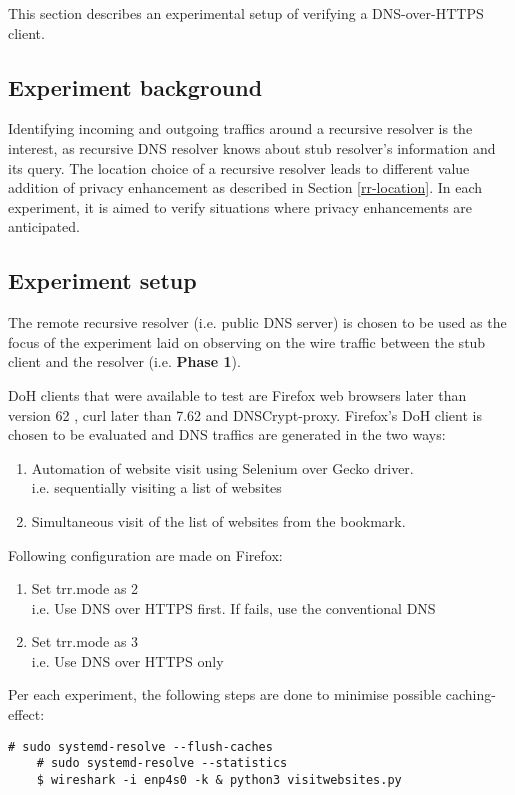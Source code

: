 This section describes an experimental setup of verifying a DNS-over-HTTPS client.

\subsection{Experiment background}
Identifying incoming and outgoing traffics around a recursive resolver is the interest, as recursive DNS resolver knows about stub resolver's information and its query.
The location choice of a recursive resolver leads to different value addition of privacy enhancement as described in Section \ref{rr-location}. In each experiment, it is aimed to verify situations where  privacy enhancements are anticipated.

\subsection{Experiment setup}\label{simulation}
The remote recursive resolver (i.e. public DNS server) is chosen to be used as the focus of the experiment laid on observing on the wire traffic between the stub client and the resolver (i.e. \textbf{Phase 1}).

DoH clients that were available to test are Firefox web browsers later than version 62 \cite{FirefoxDoH}, curl later than 7.62 \cite{CurlDoH} and DNSCrypt-proxy.
Firefox's DoH client is chosen to be evaluated and DNS traffics are generated in the two ways:
\begin{enumerate}
    \item Automation of website visit using Selenium over Gecko driver.
    \\i.e. sequentially visiting a list of websites
    \item Simultaneous visit of the list of websites from the bookmark.
\end{enumerate}
Following configuration are made on Firefox:
\begin{enumerate}
    \item Set trr.mode as 2
    \\i.e. Use DNS over HTTPS first. If fails, use the conventional DNS
    \item Set trr.mode as 3
    \\i.e. Use DNS over HTTPS only
\end{enumerate}
Per each experiment, the following steps are done to minimise possible caching-effect:
\begin{lstlisting}[basicstyle=\ttfamily]
    # sudo systemd-resolve --flush-caches
    # sudo systemd-resolve --statistics
    $ wireshark -i enp4s0 -k & python3 visitwebsites.py
\end{lstlisting}

